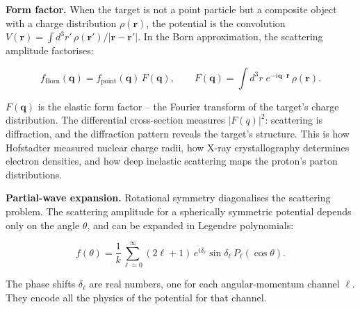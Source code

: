 \medskip\noindent\textbf{Form factor.}
When the target is not a point particle but a composite object with a charge distribution $\rho(\bm r)$, the potential is the convolution $V(\bm r) = \int d^{3}r'\,\rho(\bm r')/|\bm r-\bm r'|$. In the Born approximation, the scattering amplitude factorises:
\begin{linenomath}
\begin{equation}
f_{\text{Born}}(\bm q) = f_{\text{point}}(\bm q)\,F(\bm q),
\qquad
F(\bm q) = \int d^{3}r\;e^{-i\bm q\cdot\bm r}\,\rho(\bm r).
\label{eq:form-factor}
\end{equation}
\end{linenomath}
$F(\bm q)$ is the elastic form factor -- the Fourier transform of the target's charge distribution. The differential cross-section measures $|F(q)|^{2}$: scattering is diffraction, and the diffraction pattern reveals the target's structure. This is how Hofstadter measured nuclear charge radii, how X-ray crystallography determines electron densities, and how deep inelastic scattering maps the proton's parton distributions.

\medskip\noindent\textbf{Partial-wave expansion.}
Rotational symmetry diagonalises the scattering problem. The scattering amplitude for a spherically symmetric potential depends only on the angle $\theta$, and can be expanded in Legendre polynomials:
\begin{linenomath}
\begin{equation}
f(\theta) = \frac{1}{k}\sum_{\ell=0}^{\infty} (2\ell+1)\,e^{i\delta_{\ell}}\sin\delta_{\ell}\,P_{\ell}(\cos\theta).
\label{eq:partial-wave-expansion}
\end{equation}
\end{linenomath}
The phase shifts $\delta_{\ell}$ are real numbers, one for each angular-momentum channel $\ell$. They encode all the physics of the potential for that channel.

